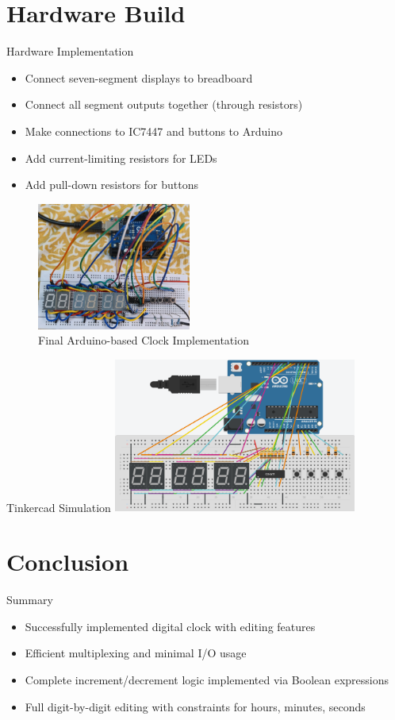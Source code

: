 \documentclass{beamer}
\begin{document}
\section{Hardware Build}
\begin{frame}{Hardware Implementation}
\begin{itemize}
    \item Connect seven-segment displays to breadboard
    \item Connect all segment outputs together (through resistors)
    \item Make connections to IC7447 and buttons to Arduino
    \item Add current-limiting resistors for LEDs
    \item Add pull-down resistors for buttons
\end{itemize}
\begin{figure}[ht]
\centering
\includegraphics[width=0.45\textwidth]{figs/clock.jpg}
\caption{Final Arduino-based Clock Implementation}
\end{figure}
\end{frame}

\begin{frame}{Tinkercad Simulation}
\centering
\includegraphics[width=0.6\textwidth]{figs/Clock_Tinkercad.png}
\caption{Clock Tinkercad Simulation}
\end{frame}

\section{Conclusion}
\begin{frame}{Summary}
\begin{itemize}
    \item Successfully implemented digital clock with editing features
    \item Efficient multiplexing and minimal I/O usage
    \item Complete increment/decrement logic implemented via Boolean expressions
    \item Full digit-by-digit editing with constraints for hours, minutes, seconds
\end{itemize}
\end{frame}
\end{document}
